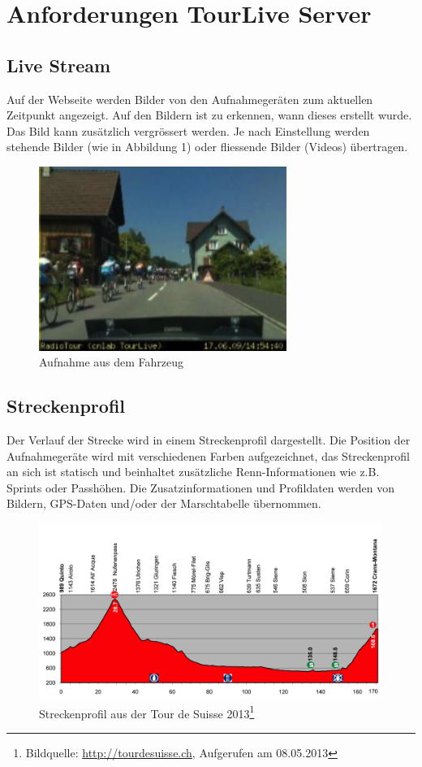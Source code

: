 \section{Anforderungen TourLive Server}
\label{sec:tourliveusecase}
\subsection{Live Stream}
Auf der Webseite werden Bilder von den Aufnahmegeräten zum aktuellen Zeitpunkt angezeigt. Auf den Bildern ist zu erkennen, wann dieses erstellt wurde. Das Bild kann zusätzlich vergrössert werden. Je nach Einstellung werden stehende Bilder (wie in Abbildung 1) oder fliessende Bilder (Videos) übertragen.
\begin{figure}[H]
	\centering
	\includegraphics[height=60mm]{images/tourliveweb/tourliveaufnahme.png}
	\caption{Aufnahme aus dem Fahrzeug}
\end{figure}

\subsection{Streckenprofil}
Der Verlauf der Strecke wird in einem Streckenprofil dargestellt. Die Position der Aufnahmegeräte wird mit verschiedenen Farben aufgezeichnet, das Streckenprofil an sich ist statisch und beinhaltet zusätzliche Renn-Informationen wie z.B. Sprints oder Passhöhen. Die Zusatzinformationen und Profildaten werden von Bildern, GPS-Daten und/oder der Marschtabelle übernommen.
\begin{figure}[H]
	\centering
	\includegraphics[width=130mm]{images/tourliveweb/streckenprofil.jpg}
	\caption{Streckenprofil aus der Tour de Suisse 2013\footnote{Bildquelle: \url{http://tourdesuisse.ch}, Aufgerufen am 08.05.2013}}
\end{figure}

